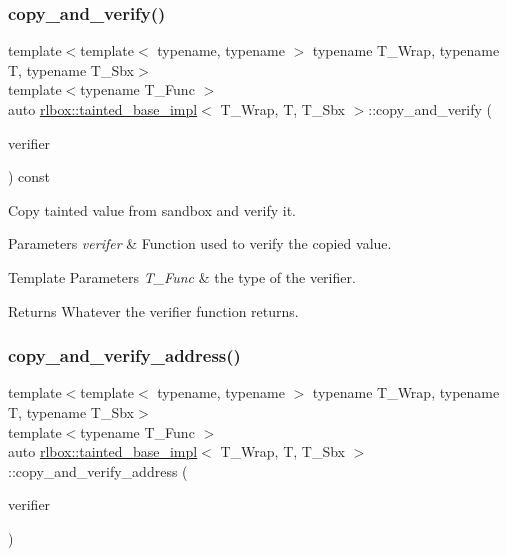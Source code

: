 \subsubsection{\texorpdfstring{copy\+\_\+and\+\_\+verify()}{copy\_and\_verify()}}
{\footnotesize\ttfamily template$<$template$<$ typename, typename $>$ typename T\+\_\+\+Wrap, typename T, typename T\+\_\+\+Sbx$>$ \\
template$<$typename T\+\_\+\+Func $>$ \\
auto \hyperlink{classrlbox_1_1tainted__base__impl}{rlbox\+::tainted\+\_\+base\+\_\+impl}$<$ T\+\_\+\+Wrap, T, T\+\_\+\+Sbx $>$\+::copy\+\_\+and\+\_\+verify (\begin{DoxyParamCaption}\item[{T\+\_\+\+Func}]{verifier }\end{DoxyParamCaption}) const\hspace{0.3cm}{\ttfamily [inline]}}



Copy tainted value from sandbox and verify it. 


\begin{DoxyParams}{Parameters}
{\em verifer} & Function used to verify the copied value. \\
\hline
\end{DoxyParams}

\begin{DoxyTemplParams}{Template Parameters}
{\em T\+\_\+\+Func} & the type of the verifier. \\
\hline
\end{DoxyTemplParams}
\begin{DoxyReturn}{Returns}
Whatever the verifier function returns. 
\end{DoxyReturn}
\mbox{\label{classrlbox_1_1tainted__base__impl_ad34419b3444d0bf37e25ecf7d37fbe0b}} 
\subsubsection{\texorpdfstring{copy\+\_\+and\+\_\+verify\+\_\+address()}{copy\_and\_verify\_address()}}
{\footnotesize\ttfamily template$<$template$<$ typename, typename $>$ typename T\+\_\+\+Wrap, typename T, typename T\+\_\+\+Sbx$>$ \\
template$<$typename T\+\_\+\+Func $>$ \\
auto \hyperlink{classrlbox_1_1tainted__base__impl}{rlbox\+::tainted\+\_\+base\+\_\+impl}$<$ T\+\_\+\+Wrap, T, T\+\_\+\+Sbx $>$\+::copy\+\_\+and\+\_\+verify\+\_\+address (\begin{DoxyParamCaption}\item[{T\+\_\+\+Func}]{verifier }\end{DoxyParamCaption})\hspace{0.3cm}{\ttfamily [inline]}}



